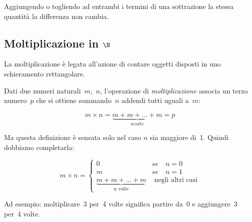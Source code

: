 \begin{definizione}
Aggiungendo o togliendo ad entrambi i 
termini di una sottrazione la stessa quantità la differenza non cambia.
\end{definizione}

\subsection{Moltiplicazione in \(\N\)}

La moltiplicazione è legata all'azione di contare oggetti disposti in uno
schieramento rettangolare.

\begin{definizione}
Dati due numeri naturali~\(m\),~\(n\), l'operazione di \emph{moltiplicazione} 
associa un terzo numero~\(p\) che si ottiene sommando~\(n\) addendi tutti 
uguali a~\(m\):

\begin{inaccessibleblock}[
\[m \times n = \mbox{n volte}{(m + m + \dots + m)} = p\]
]
\[m \times n = \underbrace{m + m + \dots + m}_{n volte} = p\]
\end{inaccessibleblock}
\end{definizione}

Ma questa definizione è sensata solo nel caso \(n\) sia maggiore di~1.
Quindi dobbiamo completarla:

\begin{inaccessibleblock}[
\begin{definizione}
\[
m \times n = \begin{cases}
 0 & se \quad n = 0\\
 m & se \quad n = 1\\
 \mbox{n volte}{(m + m + \dots + m)} & \mbox{ negli altri casi}
\end{cases}\]
\end{definizione}
]
\begin{definizione}
\[
m \times n = \begin{cases}
 0 & se \quad n = 0\\
 m & se \quad n = 1\\
 \underbrace{m + m + \dots + m}_{\text{n volte}} & \mbox{ negli altri casi}
\end{cases}\]
\end{definizione}
\end{inaccessibleblock}

Ad esempio: moltiplicare~3 per~4 volte significa partire da~0 e 
aggiungere~3 per~4 volte.

